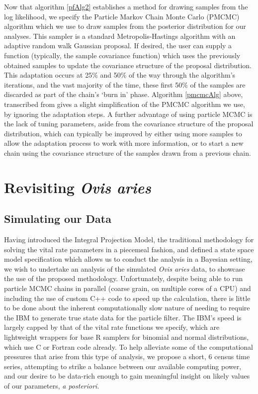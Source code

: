 \documentclass[a4paper,12pt]{article}
\begin{document}
Now that algorithm \ref{pfAlg2} establishes a method for drawing samples from the log likelihood, we specify the Particle Markov Chain Monte Carlo (PMCMC) algorithm which we use to draw samples from the posterior distribution for our analyses. This sampler is a standard Metropolis-Hastings algorithm \citep{Hastings} with an adaptive random walk Gaussian proposal. If desired, the user can supply a function (typically, the sample covariance function) which uses the previously obtained samples to update the covariance structure of the proposal distribution. This adaptation occurs at 25\% and 50\% of the way through the algorithm's iterations, and the vast majority of the time, these first 50\% of the samples are discarded as part of the chain's `burn in' phase. Algorithm \ref{pmcmcAlg} above, transcribed from \citet{Finke} gives a slight simplification of the PMCMC algorithm we use, by ignoring the adaptation steps. A further advantage of using particle MCMC is the lack of tuning parameters, aside from the covariance structure of the proposal distribution, which can typically be improved by either using more samples to allow the adaptation process to work with more information, or to start a new chain using the covariance structure of the samples drawn from a previous chain.\\

\newpage
\section{Revisiting \textit{Ovis aries}}

\subsection{Simulating our Data}
Having introduced the Integral Projection Model, the traditional methodology for solving the vital rate parameters in a piecemeal fashion, and defined a state space model specification which allows us to conduct the analysis in a Bayesian setting, we wish to undertake an analysis of the simulated \textit{Ovis aries} data, to showcase the use of the proposed methodology. Unfortunately, despite being able to run particle MCMC chains in parallel (coarse grain, on multiple cores of a CPU) and including the use of custom C++ code to speed up the calculation, there is little to be done about the inherent computationally slow nature of needing to require the IBM to generate true state data for the particle filter. The IBM's speed is largely capped by that of the vital rate functions we specify, which are lightweight wrappers for base R samplers for binomial and normal distributions, which use C or Fortran code already. To help alleviate some of the computational pressures that arise from this type of analysis, we propose a short, 6 census time series, attempting to strike a balance between our available computing power, and our desire to be data-rich enough to gain meaningful insight on likely values of our parameters, \textit{a posteriori}.\\
\end{document}
